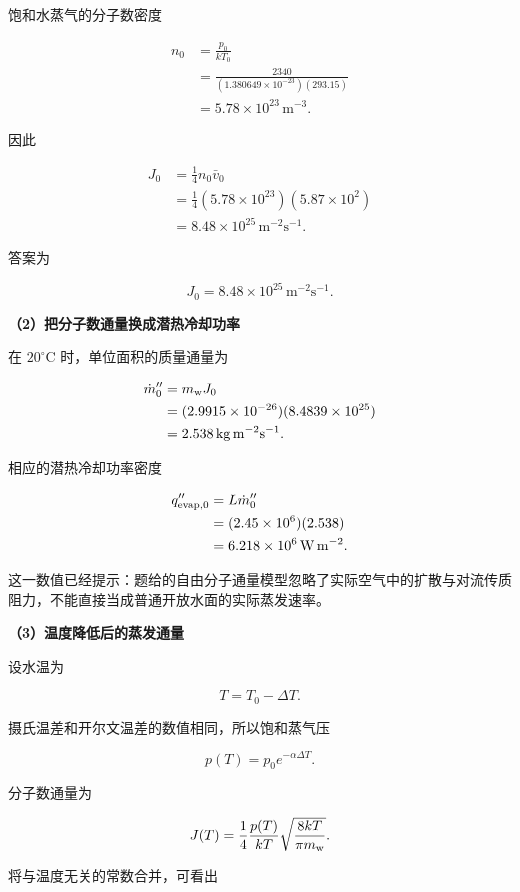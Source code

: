 \documentclass[12pt,a4paper,UTF8]{ctexart}
\begin{document}
饱和水蒸气的分子数密度

\[
\begin{aligned}
n_0
&=\frac{p_0}{kT_0}\\
&=\frac{2340}
{(1.380649\times10^{-23})(293.15)}\\
&=5.78\times10^{23}\,\mathrm{m^{-3}}.
\end{aligned}
\]

因此

\[
\begin{aligned}
J_0
&=\frac14n_0\bar v_0\\
&=\frac14(5.78\times10^{23})(5.87\times10^2)\\
&=8.48\times10^{25}\,\mathrm{m^{-2}s^{-1}}.
\end{aligned}
\]

答案为

\[
\boxed{J_0=8.48\times10^{25}\,\mathrm{m^{-2}s^{-1}}}.
\]

\textbf{（2）把分子数通量换成潜热冷却功率}

在 \(20^\circ\mathrm C\) 时，单位面积的质量通量为

\[
\begin{aligned}
\dot m_0''
&=m_{\rm w}J_0\\
&=(2.9915\times10^{-26})(8.4839\times10^{25})\\
&=2.538\,\mathrm{kg\,m^{-2}s^{-1}}.
\end{aligned}
\]

相应的潜热冷却功率密度

\[
\begin{aligned}
q_{\rm evap,0}''
&=L\dot m_0''\\
&=(2.45\times10^6)(2.538)\\
&=6.218\times10^6\,\mathrm{W\,m^{-2}}.
\end{aligned}
\]

这一数值已经提示：题给的自由分子通量模型忽略了实际空气中的扩散与对流传质阻力，不能直接当成普通开放水面的实际蒸发速率。

\textbf{（3）温度降低后的蒸发通量}

设水温为

\[
T=T_0-\Delta T.
\]

摄氏温差和开尔文温差的数值相同，所以饱和蒸气压

\[
p(T)=p_0e^{-\alpha\Delta T}.
\]

分子数通量为

\[
J(T)=\frac14\frac{p(T)}{kT}
\sqrt{\frac{8kT}{\pi m_{\rm w}}}.
\]

将与温度无关的常数合并，可看出
\end{document}
